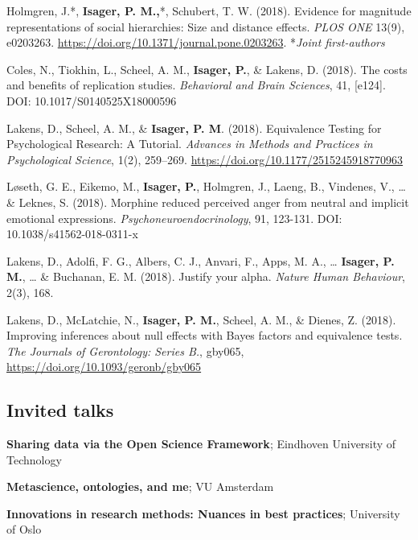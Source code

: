 \documentclass[]{article}
\providecommand{\tightlist}{%
  \setlength{\itemsep}{0pt}\setlength{\parskip}{0pt}}
\begin{document}
Holmgren, J.*, \textbf{Isager, P. M.,}*, Schubert, T. W. (2018).
Evidence for magnitude representations of social hierarchies: Size and
distance effects. \emph{PLOS ONE} 13(9), e0203263.
\url{https://doi.org/10.1371/journal.pone.0203263}. *\emph{Joint
first-authors}

Coles, N., Tiokhin, L., Scheel, A. M., \textbf{Isager, P.}, \& Lakens,
D. (2018). The costs and benefits of replication studies.
\emph{Behavioral and Brain Sciences}, 41, {[}e124{]}. DOI:
10.1017/S0140525X18000596

Lakens, D., Scheel, A. M., \& \textbf{Isager, P. M}. (2018). Equivalence
Testing for Psychological Research: A Tutorial. \emph{Advances in
Methods and Practices in Psychological Science}, 1(2), 259--269.
\url{https://doi.org/10.1177/2515245918770963}

Løseth, G. E., Eikemo, M., \textbf{Isager, P.}, Holmgren, J., Laeng, B.,
Vindenes, V., \ldots{} \& Leknes, S. (2018). Morphine reduced perceived
anger from neutral and implicit emotional expressions.
\emph{Psychoneuroendocrinology}, 91, 123-131. DOI:
10.1038/s41562-018-0311-x

Lakens, D., Adolfi, F. G., Albers, C. J., Anvari, F., Apps, M. A.,
\ldots{} \textbf{Isager, P. M.}, \ldots{} \& Buchanan, E. M. (2018).
Justify your alpha. \emph{Nature Human Behaviour}, 2(3), 168.

Lakens, D., McLatchie, N., \textbf{Isager, P. M.}, Scheel, A. M., \&
Dienes, Z. (2018). Improving inferences about null effects with Bayes
factors and equivalence tests. \emph{The Journals of Gerontology: Series
B.}, gby065, \url{https://doi.org/10.1093/geronb/gby065}

\subsection{Invited talks}\label{invited-talks}

\begin{description}
\tightlist
\item[2019]
\textbf{Sharing data via the Open Science Framework}; Eindhoven
University of Technology\\
\item[2018]
\textbf{Metascience, ontologies, and me}; VU Amsterdam\\
\item[2018]
\textbf{Innovations in research methods: Nuances in best practices};
University of Oslo
\end{description}
\end{document}
